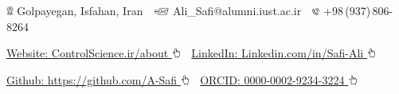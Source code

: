 \documentclass[letterpaper,MMMyyyy]{CVTemplate}
\newcommand{\CVAuthor}{Ali Safi}
\begin{document}
\centering
\Title{\CVAuthor} 
\begin{SubTitle}
{\includegraphics[height=8pt]{icons/locations.png} Golpayegan, Isfahan, Iran}
\,\SubBulletSymbol\,
{\includegraphics[height=7pt]{icons/SendEmail.png} Ali\_Safi@alumni.iust.ac.ir}
\,\SubBulletSymbol\,
\includegraphics[height=7pt]{icons/phone1.png}  +98\,(937)\,806-8264
\par
\href{https://www.controlscience.ir/about}{Website: \textcolor{Forestg}{ControlScience.ir/about} \includegraphics[height=9pt]{icons/hand-cursor.png}} 
\,\SubBulletSymbol\,
\href{https://www.linkedin.com/in/safi-ali}{LinkedIn: \textcolor{Forestg}{Linkedin.com/in/Safi-Ali} \includegraphics[height=9pt]{icons/hand-cursor.png}} 
\par
\href{https://github.com/A-Safi}{Github: \textcolor{Forestg}{https://github.com/A-Safi} \includegraphics[height=9pt]{icons/hand-cursor.png}} 
\,\SubBulletSymbol\,
\href{https://orcid.org/0000-0002-9234-3224}{ORCID: \textcolor{Forestg}{0000-0002-9234-3224} \includegraphics[height=9pt]{icons/hand-cursor.png}} 
\end{SubTitle}
\end{document}
